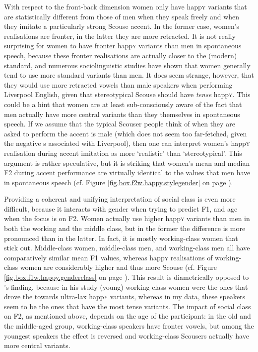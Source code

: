 With respect to the front-back dimension women only have happ\textsc{y} variants that are statistically different from those of men when they speak freely and when they imitate a particularly strong Scouse accent.
In the former case, women's realisations are fronter, in the latter they are more retracted.
It is not really surprising for women to have fronter happ\textsc{y} variants than men in spontaneous speech, because these fronter realisations are actually closer to the (modern) standard, and numerous sociolinguistic studies have shown that women generally tend to use more standard variants than men.
It does seem strange, however, that they would use more retracted vowels than male speakers when performing Liverpool English, given that stereotypical Scouse should have \emph{tense} happ\textsc{y}.
This could be a hint that women are at least sub-consciously aware of the fact that men actually have more central variants than they themselves in spontaneous speech.
If we assume that the typical Scouser people think of when they are asked to perform the accent is male (which does not seem too far-fetched, given the negative s associated with Liverpool), then one can interpret women's happ\textsc{y} realisation during accent imitation as more `realistic' than `stereotypical'.
This argument is rather speculative, but it is striking that women's mean and median F2 during accent performance are virtually identical to the values that men have in spontaneous speech (cf. Figure \ref{fig.box.f2w.happy.stylegender} on page \pageref{fig.box.f2w.happy.stylegender}).

Providing a coherent and unifying interpretation of social class is even more difficult, because it interacts with gender when trying to predict F1, and age when the focus is on F2.
Women actually use higher happ\textsc{y} variants than men in both the working and the middle class, but in the former the difference is more pronounced than in the latter.
In fact, it is mostly working-class women that stick out.
Middle-class women, middle-class men, and working-class men all have comparatively similar mean F1 values, whereas happ\textsc{y} realisations of working-class women are considerably higher and thus more Scouse (cf. Figure \ref{fig.box.f1w.happy.genderclass} on page \pageref{fig.box.f1w.happy.genderclass}).
This result is diametrically opposed to \textcite{flynn2010}'s finding, because in his study (young) working-class women were the ones that drove the  towards ultra-lax happ\textsc{y} variants, whereas in my data, these speakers seem to be the ones that have the most tense variants.
The impact of social class on F2, as mentioned above, depends on the age of the participant: in the old and the middle-aged group, working-class speakers have fronter vowels, but among the youngest speakers the effect is reversed and working-class Scousers actually have more central variants.

